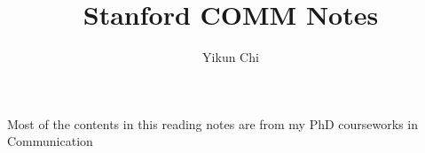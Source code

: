 \documentclass{book}
\title{Stanford COMM Notes}
\author{Yikun Chi}
\begin{document}
\maketitle
Most of the contents in this reading notes are from my PhD courseworks in Communication

\tableofcontents 






\end{document}
